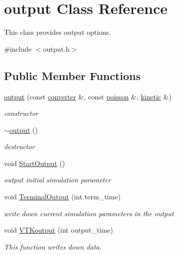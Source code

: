 \hypertarget{classoutput}{}\section{output Class Reference}
\label{classoutput}


This class provides output options.  




{\ttfamily \#include $<$output.\+h$>$}

\subsection*{Public Member Functions}
\begin{DoxyCompactItemize}
\item 
\mbox{\hyperlink{classoutput_ac5bcde3beae53d810e9e876d41bea2ac}{output}} (const \mbox{\hyperlink{classconverter}{converter}} \&, const \mbox{\hyperlink{classpoisson}{poisson}} \&, \mbox{\hyperlink{classkinetic}{kinetic}} \&)
\begin{DoxyCompactList}\small\item\em constructor \end{DoxyCompactList}\item 
\mbox{\hyperlink{classoutput_a521a9799a4d0bc73b860ca8c3694ef7c}{$\sim$output}} ()
\begin{DoxyCompactList}\small\item\em destructor \end{DoxyCompactList}\item 
void \mbox{\hyperlink{classoutput_a966b89dee3e30057e3dd35e217207256}{Start\+Output}} ()
\begin{DoxyCompactList}\small\item\em output initial simulation parameter \end{DoxyCompactList}\item 
void \mbox{\hyperlink{classoutput_a2faa52f88e4391dc693e46324f071b0a}{Terminal\+Output}} (int term\+\_\+time)
\begin{DoxyCompactList}\small\item\em write down current simulation parameters in the output \end{DoxyCompactList}\item 
void \mbox{\hyperlink{classoutput_ab34128a74d16450b92b1f42e89141aa7}{V\+T\+Koutput}} (int output\+\_\+time)
\begin{DoxyCompactList}\small\item\em This function writes down data. \end{DoxyCompactList}\item 

\end{DoxyCompactItemize}
